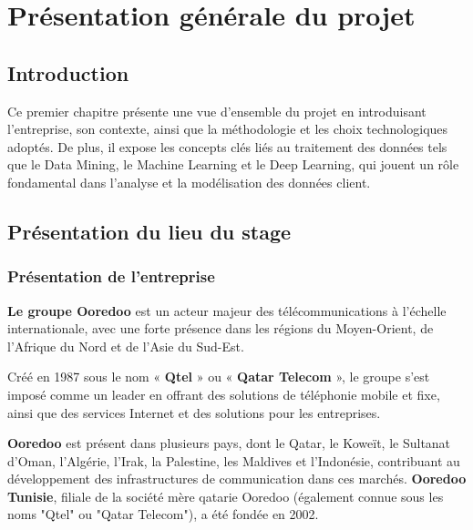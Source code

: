 \chapter{Présentation générale du projet}
\begin{spacing}{1.2}
\minitoc
\thispagestyle{MyStyle}
\end{spacing}
\newpage
\justifying

\sloppy {} 
\section{Introduction}

Ce premier chapitre présente une vue d'ensemble du projet en introduisant l'entreprise, son contexte, ainsi que la méthodologie et les choix technologiques adoptés. De plus, il expose les concepts clés liés au traitement des données tels que le Data Mining, le Machine Learning et le Deep Learning, qui jouent un rôle fondamental dans l'analyse et la modélisation des données client. 

 
\section{Présentation du lieu du stage}


\subsection{Présentation de l’entreprise}

\begin{sloppypar}
    \textbf{Le groupe Ooredoo} est un acteur majeur des télécommunications à l'échelle internationale, avec une forte présence dans les régions du Moyen-Orient, de l'Afrique du Nord et de l'Asie du Sud-Est.
\end{sloppypar}
    
Créé en 1987 sous le nom « \textbf{Qtel} » ou « \textbf{Qatar Telecom} », le groupe s'est imposé comme un leader en offrant des solutions de téléphonie mobile et fixe, ainsi que des services Internet et des solutions pour les entreprises. 

\textbf{Ooredoo} est présent dans plusieurs pays, dont le Qatar, le Koweït, le Sultanat d’Oman, l’Algérie, l’Irak, la Palestine, les Maldives et l’Indonésie, contribuant au développement des infrastructures de communication dans ces marchés.
\textbf{Ooredoo Tunisie}, filiale de la société mère qatarie Ooredoo (également connue sous les noms "Qtel" ou "Qatar Telecom"), a été fondée en 2002. 


